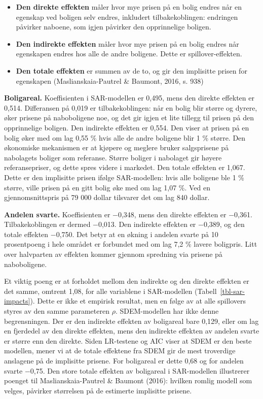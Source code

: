 \documentclass[
  norsk,
  a4paper,
]{article}
\providecommand{\tightlist}{%
  \setlength{\itemsep}{0pt}\setlength{\parskip}{0pt}}
\begin{document}
\begin{itemize}
\tightlist
\item
  \textbf{Den direkte effekten} måler hvor mye prisen på en bolig endres
  når en egenskap ved boligen selv endres, inkludert tilbakekoblingen:
  endringen påvirker naboene, som igjen påvirker den opprinnelige
  boligen.
\item
  \textbf{Den indirekte effekten} måler hvor mye prisen på en bolig
  endres når egenskapen endres hos alle de andre boligene. Dette er
  spillover-effekten.
\item
  \textbf{Den totale effekten} er summen av de to, og gir den implisitte
  prisen for egenskapen (Maslianskaia-Pautrel \& Baumont, 2016, s. 938)
\end{itemize}

\textbf{Boligareal.} Koeffisienten i SAR-modellen er 0,495, mens den
direkte effekten er 0,514. Differansen på 0,019 er tilbakekoblingen: når
en bolig blir større og dyrere, øker prisene på naboboligene noe, og det
gir igjen et lite tillegg til prisen på den opprinnelige boligen. Den
indirekte effekten er 0,554. Den viser at prisen på en bolig øker med om
lag 0,55 \% hvis alle de andre boligene blir 1 \% større. Den økonomiske
mekanismen er at kjøpere og meglere bruker salgsprisene på nabolagets
boliger som referanse. Større boliger i nabolaget gir høyere
referansepriser, og dette spres videre i markedet. Den totale effekten
er 1,067. Dette er den implisitte prisen ifølge SAR-modellen: hvis alle
boligene ble 1 \% større, ville prisen på en gitt bolig øke med om lag
1,07 \%. Ved en gjennomsnittspris på 79 000 dollar tilsvarer det om lag
840 dollar.

\textbf{Andelen svarte.} Koeffisienten er −0,348, mens den direkte
effekten er −0,361. Tilbakekoblingen er dermed −0,013. Den indirekte
effekten er −0,389, og den totale effekten −0,750. Det betyr at en
økning i andelen svarte på 10 prosentpoeng i hele området er forbundet
med om lag 7,2 \% lavere boligpris. Litt over halvparten av effekten
kommer gjennom spredning via prisene på naboboligene.

Et viktig poeng er at forholdet mellom den indirekte og den direkte
effekten er det samme, omtrent 1,08, for alle variablene i SAR-modellen
(Tabell~\ref{tbl-sar-impacts}). Dette er ikke et empirisk resultat, men
en følge av at alle spillovers styres av den samme parameteren \(\rho\).
SDEM-modellen har ikke denne begrensningen. Der er den indirekte
effekten av boligareal bare 0,129, eller om lag en fjerdedel av den
direkte effekten, mens den indirekte effekten av andelen svarte er
større enn den direkte. Siden LR-testene og AIC viser at SDEM er den
beste modellen, mener vi at de totale effektene fra SDEM gir de mest
troverdige anslagene på de implisitte prisene. For boligareal er dette
0,68 og for andelen svarte −0,75. Den store totale effekten av
boligareal i SAR-modellen illustrerer poenget til Maslianskaia-Pautrel
\& Baumont (2016): hvilken romlig modell som velges, påvirker størrelsen
på de estimerte implisitte prisene.
\end{document}
